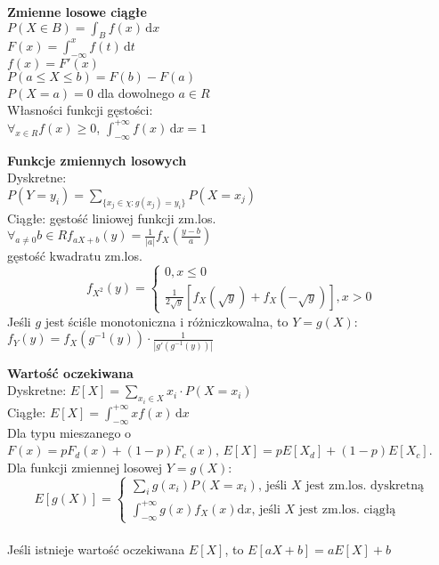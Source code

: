 \documentclass[10pt,landscape,a4paper,notitlepage]{article}
\begin{document}
\begin{multicols*}{4}
        \noindent \textbf{\large Zmienne losowe ciągłe}\\
        $P(X\in B)=\int_{B} f(x)\,\mathrm{d}x$\\
        $F(x)=\int_{-\infty}^xf(t)\,\mathrm{d}t$\\
        $f(x)=F'(x)$\\
        $P(a\leq X\leq b)=F(b)-F(a)$\\
        $P(X = a)=0$ dla dowolnego $a\in R$\\
        Własności funkcji gęstości:\\
        $\forall_{x\in R}f(x)\geq 0$, $\int_{-\infty}^{+\infty}f(x)\,\mathrm{d}x=1$
        

        \noindent\textbf{\large Funkcje zmiennych losowych}\\
        Dyskretne:\\ $P(Y=y_i)=\sum_{\{x_j\in\chi:g(x_j)=y_i\}}P(X=x_j)$\\
        Ciągłe: gęstość liniowej funkcji zm.los.\\ $\forall_{a\neq 0}b\in R f_{aX+b}(y)=\frac{1}{|a|}f_X\left(\frac{y-b}{a}\right)$\\
        gęstość kwadratu zm.los.\\
        \[
            f_{X^2}(y)=
            \begin{cases}
                0, x\leq 0\\
                \frac{1}{2\sqrt{y}}\left[f_X(\sqrt{y})+f_X(-\sqrt{y})\right], x>0
            \end{cases}
        \]
        Jeśli $g$ jest ściśle monotoniczna i różniczkowalna, to $Y=g(X)$: $f_Y(y)=f_X(g^{-1}(y))\cdot\frac{1}{|g'(g^{-1}(y))|}$

        \noindent\textbf{\large Wartość oczekiwana}\\
        Dyskretne: $E[X]=\sum_{x_i\in X}x_i\cdot P(X=x_i)$\\
        Ciągłe: $E[X]=\int_{-\infty}^{+\infty}xf(x)\,\mathrm{d}x$\\
        Dla typu mieszanego o $F(x)=pF_d(x)+(1-p)F_c(x),\,E[X]=pE[X_d]+(1-p)E[X_c]$.\\
        Dla funkcji zmiennej losowej $Y=g(X)$:
        {
            \tiny
            \[
                E[g(X)]=
                \begin{cases}
                    \sum_ig(x_i)P(X=x_i),\,\text{jeśli } X \text{ jest zm.los. dyskretną}\\
                    \int_{-\infty}^{+\infty}g(x)f_X(x)\mathrm{d}x,\,\text{jeśli } X \text{ jest zm.los. ciągłą}
                \end{cases}
            \]
        }\\
        Jeśli istnieje wartość oczekiwana $E[X]$, to $E[aX+b]=aE[X]+b$


\end{multicols*}
\end{document}
